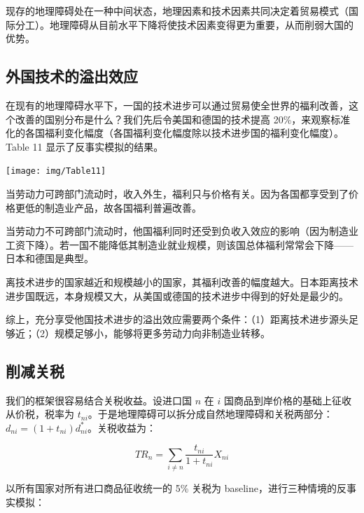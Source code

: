 \documentclass[
]{article}
\begin{document}
现存的地理障碍处在一种中间状态，地理因素和技术因素共同决定着贸易模式（国际分工）。地理障碍从目前水平下降将使技术因素变得更为重要，从而削弱大国的优势。

\hypertarget{ux5916ux56fdux6280ux672fux7684ux6ea2ux51faux6548ux5e94}{%
\subsection{外国技术的溢出效应}\label{ux5916ux56fdux6280ux672fux7684ux6ea2ux51faux6548ux5e94}}

在现有的地理障碍水平下，一国的技术进步可以通过贸易使全世界的福利改善，这个改善的国别分布是什么？我们先后令美国和德国的技术提高 20\%，来观察标准化的各国福利变化幅度（各国福利变化幅度除以技术进步国的福利变化幅度）。Table 11 显示了反事实模拟的结果。

\begin{center}\texttt{[image: img/Table11]} \end{center}

当劳动力可跨部门流动时，收入外生，福利只与价格有关。因为各国都享受到了价格更低的制造业产品，故各国福利普遍改善。

当劳动力不可跨部门流动时，他国福利同时还受到负收入效应的影响（因为制造业工资下降）。若一国不能降低其制造业就业规模，则该国总体福利常常会下降------日本和德国是典型。

离技术进步的国家越近和规模越小的国家，其福利改善的幅度越大。日本距离技术进步国既远，本身规模又大，从美国或德国的技术进步中得到的好处是最少的。

综上，充分享受他国技术进步的溢出效应需要两个条件：（1）距离技术进步源头足够近；（2）规模足够小，能够将更多劳动力向非制造业转移。

\hypertarget{ux524aux51cfux5173ux7a0e}{%
\subsection{削减关税}\label{ux524aux51cfux5173ux7a0e}}

我们的框架很容易结合关税收益。设进口国 \(n\) 在 \(i\)
国商品到岸价格的基础上征收从价税，税率为
\(t_{ni}\)。于是地理障碍可以拆分成自然地理障碍和关税两部分：\(d_{n i}=\left(1+t_{n i}\right) d_{n i}^{*}\)。关税收益为：

\[
T R_{n}=\sum_{i \neq n} \frac{t_{n i}}{1+t_{n i}} X_{n i}
\]

以所有国家对所有进口商品征收统一的 5\% 关税为 baseline，进行三种情境的反事实模拟：
\end{document}
